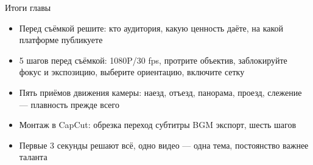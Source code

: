 \begin{tcbsummary}{Итоги главы}
\begin{itemize}
  \item Перед съёмкой решите: кто аудитория, какую ценность даёте, на какой платформе публикуете
  \item 5 шагов перед съёмкой: 1080P/30 fps, протрите объектив, заблокируйте фокус и экспозицию, выберите ориентацию, включите сетку
  \item Пять приёмов движения камеры: наезд, отъезд, панорама, проезд, слежение — плавность прежде всего
  \item Монтаж в CapCut: обрезка переход субтитры BGM экспорт, шесть шагов
  \item Первые 3 секунды решают всё, одно видео — одна тема, постоянство важнее таланта
\end{itemize}

\end{tcbsummary}
